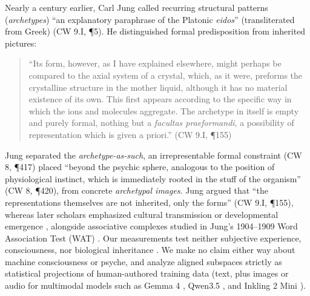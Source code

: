 \documentclass[conference]{IEEEtran}
\begin{document}
Nearly a century earlier, Carl Jung called recurring structural patterns (\textit{archetypes}) ``an explanatory paraphrase of the Platonic \textit{eidos}'' (transliterated from Greek) \cite{jung1968archetypes} (CW 9.I, \P5). He distinguished formal predisposition from inherited pictures:
\begin{quote}
\small
``Its form, however, as I have explained elsewhere, might perhaps be compared to the axial system of a crystal, which, as it were, preforms the crystalline structure in the mother liquid, although it has no material existence of its own. This first appears according to the specific way in which the ions and molecules aggregate. The archetype in itself is empty and purely formal, nothing but a \textit{facultas praeformandi}, a possibility of representation which is given a priori.'' \cite{jung1968archetypes} (CW 9.I, \P155)
\end{quote}
Jung separated the \textit{archetype-as-such}, an irrepresentable formal constraint \cite{jung1969structure} (CW 8, \P417) placed ``beyond the psychic sphere, analogous to the position of physiological instinct, which is immediately rooted in the stuff of the organism'' \cite{jung1969structure} (CW 8, \P420), from concrete \textit{archetypal images}. Jung argued that ``the representations themselves are not inherited, only the forms'' \cite{jung1968archetypes} (CW 9.I, \P155), whereas later scholars emphasized cultural transmission \cite{roesler2012archetypes} or developmental emergence \cite{hogenson2001baldwin,knox2003archetype}, alongside associative complexes studied in Jung's 1904--1909 Word Association Test (WAT) \cite{jung1973experimental,jung1976symbolic}. Our measurements test neither subjective experience, consciousness, nor biological inheritance \cite{butlin2023consciousness,shanahan2024talking}. We make no claim either way about machine consciousness or psyche, and analyze aligned subspaces strictly as statistical projections of human-authored training data (text, plus images or audio for multimodal models such as Gemma 4 \cite{gemmateam2026gemma4}, Qwen3.5 \cite{qwen2026qwen35}, and Inkling 2 Mini \cite{thinkingmachines2026inkling}).
\end{document}
